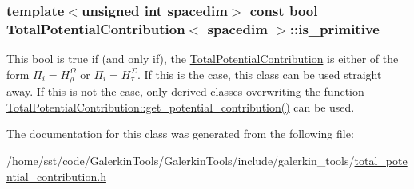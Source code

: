 \subsubsection[{\texorpdfstring{is\+\_\+primitive}{is_primitive}}]{\setlength{\rightskip}{0pt plus 5cm}template$<$unsigned int spacedim$>$ const bool {\bf Total\+Potential\+Contribution}$<$ spacedim $>$\+::is\+\_\+primitive}\hypertarget{class_total_potential_contribution_a45bfb25a7693c949c26e223cf4a1a1e7}{}\label{class_total_potential_contribution_a45bfb25a7693c949c26e223cf4a1a1e7}
This bool is {\ttfamily true} if (and only if), the \hyperlink{class_total_potential_contribution}{Total\+Potential\+Contribution} is either of the form $\Pi_i=H^\Omega_\rho$ or $\Pi_i=H^\Sigma_\tau$. If this is the case, this class can be used straight away. If this is not the case, only derived classes overwriting the function \hyperlink{class_total_potential_contribution_a0d281fceeb90ece5c4d2655df5eb9948}{Total\+Potential\+Contribution\+::get\+\_\+potential\+\_\+contribution()} can be used. 

The documentation for this class was generated from the following file\+:\begin{DoxyCompactItemize}
\item 
/home/sst/code/\+Galerkin\+Tools/\+Galerkin\+Tools/include/galerkin\+\_\+tools/\hyperlink{total__potential__contribution_8h}{total\+\_\+potential\+\_\+contribution.\+h}\end{DoxyCompactItemize}
